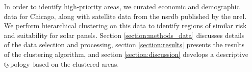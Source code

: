 In order to identify high-priority areas, we curated economic and demographic
data for Chicago, along with satellite data from the \ac{nsrdb} published by the
\ac{nrel}. We perform hierarchical clustering on this data to identify regions of
similar risk and suitability for solar panels. Section \ref{section:methods_data}
discusses details of the data selection and processing, section \ref{section:results}
presents the results of the clustering algorithm, and section \ref{section:discussion}
develops a descriptive typology based on the clustered areas.
